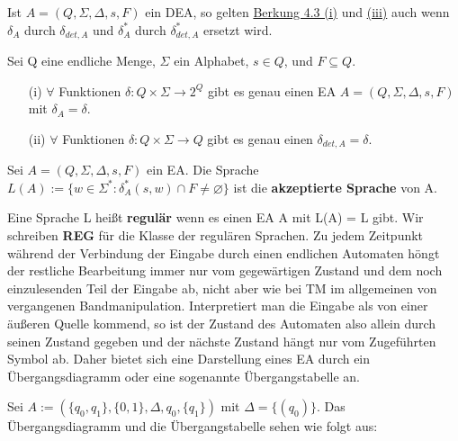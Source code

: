     Ist \(A = (Q, \Sigma, \Delta, s, F)\) ein DEA, so gelten \hyperref[subsec:4.3]{Berkung 4.3 (i)} und \hyperref[subsec:4.3]{(iii)} auch wenn \(\delta_{A}\) durch \(\delta_{det, A}\) und \(\delta_{A}^{*}\) durch \(\delta_{det, A}^{*}\) ersetzt wird.

    Sei Q eine endliche Menge, \(\Sigma\) ein Alphabet, \(s\in Q\), und \(F\subseteq Q\). 
    \begin{itemize}
        \item [(i)] \(\forall\) Funktionen \(\delta : Q \times \Sigma \rightarrow 2^{Q}\) gibt es genau einen EA \(A = (Q, \Sigma, \Delta, s, F)\) mit \(\delta_{A} = \delta\).
        \item [(ii)] \(\forall\) Funktionen \(\delta : Q \times \Sigma \rightarrow Q\) gibt es genau einen \(\delta_{det, A} = \delta\). 
    \end{itemize}

    Sei \(A = (Q, \Sigma, \Delta, s, F)\) ein EA. Die Sprache \(L(A) := \{w \in \Sigma^{*} : \delta_{A}^{*}(s, w)\cap F \neq \varnothing \}\) ist die \textbf{akzeptierte Sprache} von A.

    Eine Sprache L heißt \textbf{regulär} wenn es einen EA A mit L(A) = L gibt. Wir schreiben \textbf{REG} für die Klasse der regulären Sprachen. Zu jedem Zeitpunkt während der Verbindung der Eingabe durch einen endlichen Automaten höngt der restliche Bearbeitung immer nur vom gegewärtigen Zustand und dem noch einzulesenden Teil der Eingabe ab, nicht aber wie bei TM im allgemeinen von vergangenen Bandmanipulation. Interpretiert man die Eingabe als von einer äußeren Quelle kommend, so ist der  Zustand des Automaten also allein durch seinen Zustand gegeben und der nächste Zustand hängt nur vom Zugeführten Symbol ab. Daher bietet sich eine Darstellung eines EA durch ein Übergangsdiagramm oder eine sogenannte Übergangstabelle an.

\newpage
{}
    Sei \(A := (\{q_{0}, q_{1}\}, \{0, 1\}, \Delta, q_{0}, \{q_{1}\})\) mit \(\Delta = \{(q_{0})\}\). Das Übergangsdiagramm und die Übergangstabelle sehen wie folgt aus:

